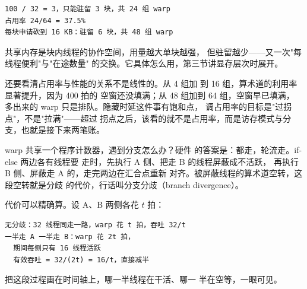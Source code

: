 \begin{lstlisting}
100 / 32 = 3，只能驻留 3 块，共 24 组 warp
占用率 24/64 = 37.5%
每块申请砍到 16 KB：驻留 6 块，共 48 组 warp
\end{lstlisting}

共享内存是块内线程的协作空间，用量越大单块越强，
但驻留越少——又一次"每线程便利"与"在途数量"
的交换。它具体怎么用，第三节讲显存层次时展开。

还要看清占用率与性能的关系不是线性的。从 4 组加
到 16 组，算术道的利用率显著提升，因为 400 拍的
空窗还没填满；从 48 组加到 64 组，空窗早已填满，
多出来的 warp 只是排队。隐藏时延这件事有饱和点，
调占用率的目标是"过拐点"，不是"拉满"——超过
拐点之后，该看的就不是占用率，而是访存模式与分
支，也就是接下来两笔账。

warp 共享一个程序计数器，遇到分支怎么办？硬件
的答案是：都走，轮流走。if-else 两边各有线程要
走时，先执行 A 侧、把走 B 的线程屏蔽成不活跃，
再执行 B 侧、屏蔽走 A 的，走完两边在汇合点重新
对齐。被屏蔽线程的算术道空转，这段空转就是分歧
的代价，行话叫分支分歧（branch divergence）。

代价可以精确算。设 A、B 两侧各花 $t$ 拍：

\begin{lstlisting}
无分歧：32 线程同走一路，warp 花 t 拍，吞吐 32/t
一半走 A 一半走 B：warp 花 2t 拍，
  期间每侧只有 16 线程活跃
  有效吞吐 = 32/(2t) = 16/t，直接减半
\end{lstlisting}

把这段过程画在时间轴上，哪一半线程在干活、哪一
半在空等，一眼可见。

